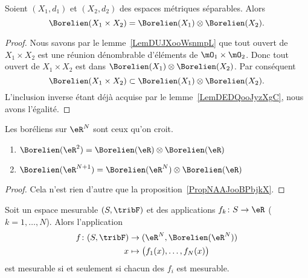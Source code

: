 \begin{proposition}        \label{PropNAAJooBPbjkX}
    Soient \( (X_1,d_1)\) et \( (X_2,d_2)\) des espaces métriques séparables. Alors
    \begin{equation}
        \Borelien(X_1\times X_2)=\Borelien(X_1)\otimes \Borelien(X_2).
    \end{equation}
\end{proposition}

\begin{proof}
    Nous savons par le lemme~\ref{LemDUJXooWsnmpL} que tout ouvert de \( X_1\times X_2\) est une réunion dénombrable d'éléments de \( \mO_1\times\mO_2\). Donc tout ouvert de \( X_1\times X_2\) est dans \( \Borelien(X_1)\otimes \Borelien(X_2)\). Par conséquent
    \begin{equation}
        \Borelien(X_1\times X_2)\subset \Borelien(X_1)\otimes \Borelien(X_2).
    \end{equation}
    L'inclusion inverse étant déjà acquise par le lemme~\ref{LemDEDQooJyzXgC}, nous avons l'égalité.
\end{proof}

\begin{proposition}     \label{CorWOOOooHcoEEF}
    Les boréliens sur \( \eR^N\) sont ceux qu'on croit.
    \begin{enumerate}
        \item
            \( \Borelien(\eR^2)=\Borelien(\eR)\otimes \Borelien(\eR)\)
        \item
            \( \Borelien(\eR^{N+1})=\Borelien(\eR^N)\otimes \Borelien(\eR)\)
    \end{enumerate}
\end{proposition}

\begin{proof}
    Cela n'est rien d'autre que la proposition~\ref{PropNAAJooBPbjkX}.
\end{proof}

\begin{proposition}
    Soit un espace mesurable \( (S,\tribF)\) et des applications \( f_k\colon S\to \eR\) (\( k=1,\ldots, N\)). Alors l'application
    \begin{equation}
        \begin{aligned}
            f\colon (S,\tribF)&\to (\eR^N,\Borelien(\eR^N)) \\
            x&\mapsto \big( f_1(x),\ldots, f_N(x) \big)
        \end{aligned}
    \end{equation}
    est mesurable si et seulement si chacun des \( f_i\) est mesurable.
\end{proposition}

